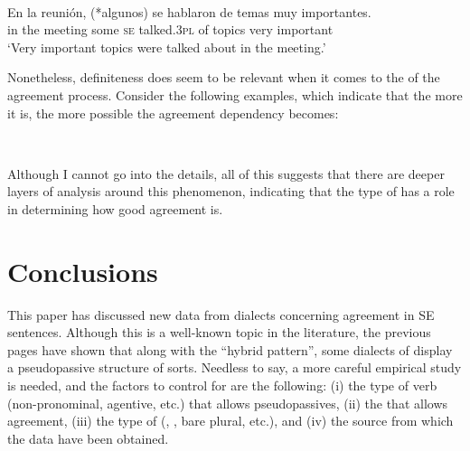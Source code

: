 \documentclass[output=paper]{langsci/langscibook}
\begin{document}
\ea%
    \label{ex:gallego:41}\\
    \gll En la    reunión, (*algunos) se hablaron   de  temas  muy importantes.\\
         in   the meeting  some     \textsc{se} talked.\textsc{3pl}   of  topics  very important\\
    \glt ‘Very important topics were talked about in the meeting.’
    \z

Nonetheless, definiteness does seem to be relevant when it comes to the  of the agreement process. Consider the following examples, which indicate that the more  it is, the more possible the agreement dependency becomes:



\ea%
    \label{ex:gallego:42}\\
    \z
\z    

Although I cannot go into the details, all of this suggests that there are deeper layers of analysis around this phenomenon, indicating that the type of  has a role in determining how good agreement is.


\section{Conclusions}%
This paper has discussed new data from  dialects concerning agreement in SE sentences. Although this is a well-known topic in the literature, the previous pages have shown that along with the “hybrid pattern”, some dialects of  display a pseudopassive structure of sorts. Needless to say, a more careful empirical study is needed, and the factors to control for are the following: (i) the type of verb (non-pronominal, agentive, etc.) that allows pseudopassives, (ii) the  that allows agreement, (iii) the type of  (\CATDP, \CATNP, bare plural, etc.), and (iv) the source from which the data have been obtained. 
\end{document}
